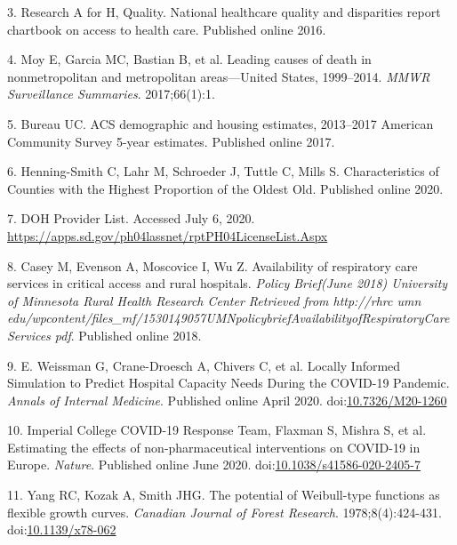 \documentclass[
]{article}
\begin{document}
\leavevmode\hypertarget{ref-research_national_2016}{}%
3. Research A for H, Quality. National healthcare quality and disparities report chartbook on access to health care. Published online 2016.

\leavevmode\hypertarget{ref-moy_leading_2017}{}%
4. Moy E, Garcia MC, Bastian B, et al. Leading causes of death in nonmetropolitan and metropolitan areas---United States, 1999--2014. \emph{MMWR Surveillance Summaries}. 2017;66(1):1.

\leavevmode\hypertarget{ref-bureau_acs_2017}{}%
5. Bureau UC. ACS demographic and housing estimates, 2013--2017 American Community Survey 5-year estimates. Published online 2017.

\leavevmode\hypertarget{ref-henning-smith_characteristics_2020}{}%
6. Henning-Smith C, Lahr M, Schroeder J, Tuttle C, Mills S. Characteristics of Counties with the Highest Proportion of the Oldest Old. Published online 2020.

\leavevmode\hypertarget{ref-noauthor_doh_nodate}{}%
7. DOH Provider List. Accessed July 6, 2020. \url{https://apps.sd.gov/ph04lassnet/rptPH04LicenseList.Aspx}

\leavevmode\hypertarget{ref-casey_availability_2018}{}%
8. Casey M, Evenson A, Moscovice I, Wu Z. Availability of respiratory care services in critical access and rural hospitals. \emph{Policy Brief(June 2018) University of Minnesota Rural Health Research Center Retrieved from http://rhrc umn edu/wpcontent/files\_mf/1530149057UMNpolicybriefAvailabilityofRespiratoryCareServices pdf}. Published online 2018.

\leavevmode\hypertarget{ref-e_weissman_locally_2020}{}%
9. E. Weissman G, Crane-Droesch A, Chivers C, et al. Locally Informed Simulation to Predict Hospital Capacity Needs During the COVID-19 Pandemic. \emph{Annals of Internal Medicine}. Published online April 2020. doi:\href{https://doi.org/10.7326/M20-1260}{10.7326/M20-1260}

\leavevmode\hypertarget{ref-imperial_college_covid-19_response_team_estimating_2020}{}%
10. Imperial College COVID-19 Response Team, Flaxman S, Mishra S, et al. Estimating the effects of non-pharmaceutical interventions on COVID-19 in Europe. \emph{Nature}. Published online June 2020. doi:\href{https://doi.org/10.1038/s41586-020-2405-7}{10.1038/s41586-020-2405-7}

\leavevmode\hypertarget{ref-yang_potential_1978}{}%
11. Yang RC, Kozak A, Smith JHG. The potential of Weibull-type functions as flexible growth curves. \emph{Canadian Journal of Forest Research}. 1978;8(4):424-431. doi:\href{https://doi.org/10.1139/x78-062}{10.1139/x78-062}
\end{document}
